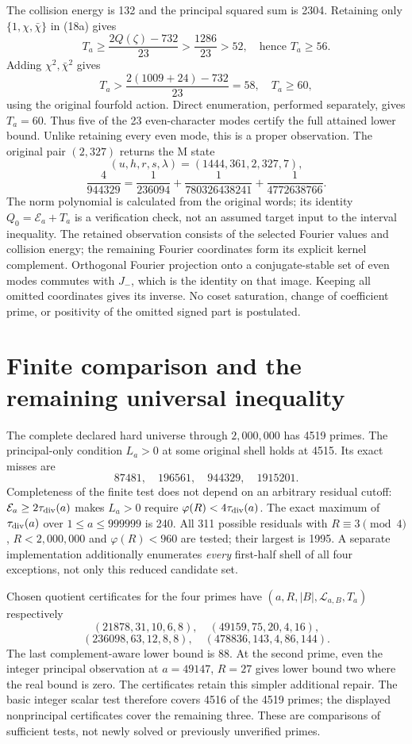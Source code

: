 The collision energy is 132 and the principal squared sum is 2304. Retaining only
$\{1,\chi,\bar\chi\}$ in (18a) gives
\[
 T_a\ge\frac{2Q(\zeta)-732}{23}>\frac{1286}{23}>52,
 \quad\text{hence }T_a\ge56.
\]
Adding $\chi^2,\bar\chi^2$ gives
\[
 \boxed{T_a>\frac{2(1009+24)-732}{23}=58,
         \quad T_a\ge60,}                               \tag{25b}
\]
using the original fourfold action. Direct enumeration, performed separately,
gives $T_a=60$. Thus five of the 23 even-character modes certify the full attained
lower bound. Unlike retaining every even mode, this is a proper observation.
The original pair $(2,327)$ returns the M state
\[
 (u,h,r,s,\lambda)=(1444,361,2,327,7),
\]
\[
 \frac4{944329}=\frac1{236094}+\frac1{780326438241}
                         +\frac1{4772638766}.
\]
The norm polynomial is calculated from the original words; its identity
$Q_0=\mathcal E_a+T_a$ is a verification check, not an assumed target input to
the interval inequality. The retained observation consists of the selected
Fourier values and collision energy; the remaining Fourier coordinates form
its explicit kernel complement. Orthogonal Fourier projection onto a
conjugate-stable set of even modes commutes with $J_-$, which is the identity
on that image. Keeping all omitted coordinates gives its inverse. No coset
saturation, change of coefficient prime, or positivity of the omitted signed
part is postulated.

\section{Finite comparison and the remaining universal inequality}
The complete declared hard universe through $2{,}000{,}000$ has 4519 primes.
The principal-only condition $L_a>0$ at some original shell holds at 4515.
Its exact misses are
\[
 87481,\quad196561,\quad944329,\quad1915201.              \tag{26}
\]
Completeness of the finite test does not depend on an arbitrary residual cutoff:
$\mathcal E_a\ge2\tau_{\rm div}(a)$ makes $L_a>0$ require
$\varphi(R)<4\tau_{\rm div}(a)$. The exact maximum of $\tau_{\rm div}(a)$ over
$1\le a\le999999$ is 240. All 311 possible residuals with $R\equiv3\pmod4$,
$R<2{,}000{,}000$ and $\varphi(R)<960$ are tested; their largest is 1995.
A separate implementation additionally enumerates \emph{every} first-half shell
of all four exceptions, not only this reduced candidate set.

Chosen quotient certificates for the four primes have
$(a,R,|B|,\mathcal L_{a,B},T_a)$ respectively
\[
 (21878,31,10,6,8),\quad(49159,75,20,4,16),
\]
\[
 (236098,63,12,8,8),\quad(478836,143,4,86,144).
\]
The last complement-aware lower bound is 88. At the second prime, even the
integer principal observation at $a=49147$, $R=27$ gives lower bound two where
the real bound is zero. The certificates retain this simpler additional repair.
The basic integer scalar test therefore covers 4516 of the 4519 primes; the
displayed nonprincipal certificates cover the remaining three. These are
comparisons of sufficient tests, not newly solved or previously unverified primes.

